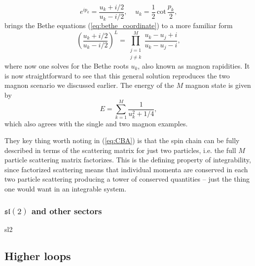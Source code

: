 \begin{equation}
	e^{ip_k} = \frac{u_k + i/2}{u_k - i/2}, \;\;\;\; u_k = \frac{1}{2} \, \mathrm{cot} \, \frac{p_k}{2},
\end{equation}
brings the Bethe equations (\ref{eq:bethe_coordinate}) to a more familiar form
\begin{equation}
	\left( \frac{u_k + i/2}{u_k - i/2} \right)^L = \prod_{\substack{j=1 \\ j \neq k}}^M \frac{u_k - u_j + i}{u_k - u_j - i},
\end{equation}
where now one solves for the Bethe roots $u_k$, also known as magnon rapidities. 
It is now straightforward to see that this general solution reproduces the two magnon scenario we discussed earlier. 
The energy of the $M$ magnon state is given by
\begin{equation}
	E = \sum_{k=1}^M \frac{1}{u_k^2 + 1/4},
\end{equation}
 which also agrees with the single and two magnon examples. 
 
They key thing worth noting in (\ref{eq:CBA}) is that the spin chain can be fully described in terms of the scattering matrix for just two particles, i.e. the full $M$ particle scattering matrix factorizes.
This is the defining property of integrability, since factorized scattering means that individual momenta are conserved in each two particle scattering producing a tower of conserved quantities -- just the thing one would want in an integrable system. 
 
\subsubsection{$\mathfrak{sl}(2)$ and other sectors}

sl2

\subsection{Higher loops}


